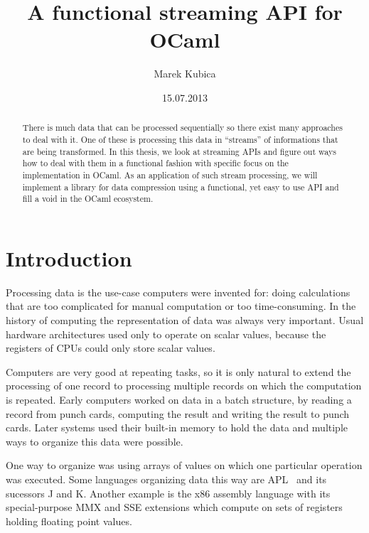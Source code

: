 \documentclass[parskip=half]{scrreprt}
\author{Marek Kubica}
\title{A functional streaming API for OCaml}
\date{15.07.2013}
\begin{document}




{}

\begin{abstract}
\subsubsection*{\abstractname}


There is much data that can be processed sequentially so there exist many
approaches to deal with it. One of these is processing this data in
\enquote{streams} of informations that are being transformed. In this thesis,
we look at streaming APIs and figure out ways how to deal with them in a
functional fashion with specific focus on the implementation in OCaml. As an
application of such stream processing, we will implement a library for data
compression using a functional, yet easy to use API and fill a void in the
OCaml ecosystem.

\end{abstract}

\tableofcontents

\chapter{Introduction}
\label{sec:intro}

Processing data is the use-case computers were invented for: doing calculations
that are too complicated for manual computation or too time-consuming.  In the
history of computing the representation of data was always very important.
Usual hardware architectures used only to operate on scalar values, because the
registers of CPUs could only store scalar values.

Computers are very good at repeating tasks, so it is only natural to extend the
processing of one record to processing multiple records on which the
computation is repeated. Early computers worked on data in a batch structure,
by reading a record from punch cards, computing the result and writing the
result to punch cards. Later systems used their built-in memory to hold the
data and multiple ways to organize this data were possible.

One way to organize was using arrays of values on which one particular
operation was executed. Some languages organizing data this way are
APL~\cite[p.~53]{biancuzzi2009masterminds} and its sucessors J and K.  Another
example is the x86 assembly language with its special-purpose MMX and SSE
extensions which compute on sets of registers holding floating point values.
\end{document}
